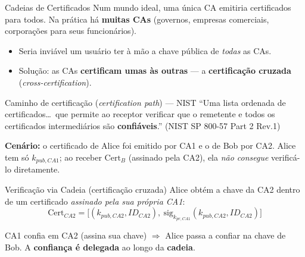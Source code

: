 \documentclass{beamer}
\begin{document}
\begin{frame}{Cadeias de Certificados}
    Num mundo ideal, uma única CA emitiria certificados para todos. Na prática há \textbf{muitas CAs} (governos, empresas comerciais, corporações para seus funcionários).
    \medskip
    \begin{itemize}
        \footnotesize
        \item Seria inviável um usuário ter à mão a chave pública de \emph{todas} as CAs.
        \item Solução: as CAs \textbf{certificam umas às outras} --- a \textbf{certificação cruzada} (\textit{cross-certification}).
    \end{itemize}
    \medskip
    \begin{block}{Caminho de certificação (\textit{certification path}) --- NIST}
        \footnotesize
        ``Uma lista ordenada de certificados\dots\ que permite ao receptor verificar que o remetente e todos os certificados intermediários são \textbf{confiáveis}.''
        \hfill {\tiny (NIST SP 800-57 Part 2 Rev.1)}
    \end{block}
    \medskip
    {\footnotesize \textbf{Cenário:} o certificado de Alice foi emitido por CA1 e o de Bob por CA2. Alice tem só $k_{pub,CA1}$; ao receber $\text{Cert}_B$ (assinado pela CA2), ela \emph{não consegue} verificá-lo diretamente.}
\end{frame}

\begin{frame}{Verificação via Cadeia (certificação cruzada)}
    Alice obtém a chave da CA2 dentro de um certificado \emph{assinado pela sua própria CA1}:
    {\small\[ \text{Cert}_{CA2} = \big[(k_{pub,CA2}, ID_{CA2}),\ \mathrm{sig}_{k_{pr,CA1}}(k_{pub,CA2}, ID_{CA2})\big] \]}
    \begin{center}
    \end{center}
    \vspace{-0.2em}
    \begin{tcolorbox}[colback=green!6,colframe=green!50!black,boxrule=0.5pt]
        \footnotesize
        CA1 confia em CA2 (assina sua chave) $\Rightarrow$ Alice passa a confiar na chave de Bob. A \textbf{confiança é delegada} ao longo da \textbf{cadeia}.
    \end{tcolorbox}
\end{frame}
\end{document}
